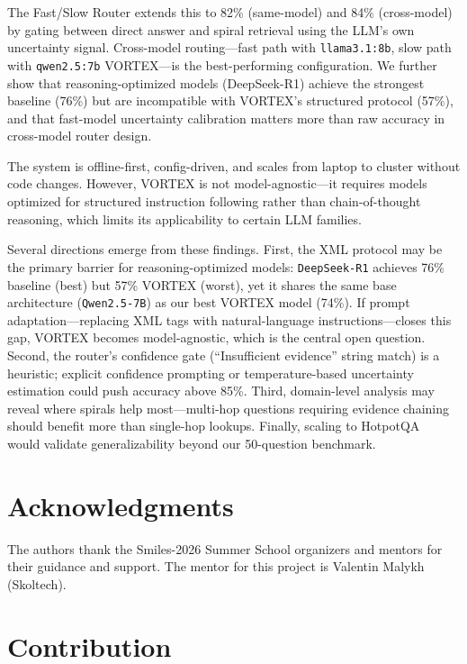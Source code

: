 \documentclass{zapiski}
\begin{document}
The Fast/Slow Router extends this to 82\% (same-model) and 84\% (cross-model) by gating between direct answer and spiral retrieval using the LLM's own uncertainty signal. Cross-model routing---fast path with \texttt{llama3.1:8b}, slow path with \texttt{qwen2.5:7b} VORTEX---is the best-performing configuration. We further show that reasoning-optimized models (DeepSeek-R1) achieve the strongest baseline (76\%) but are incompatible with VORTEX's structured protocol (57\%), and that fast-model uncertainty calibration matters more than raw accuracy in cross-model router design.

The system is offline-first, config-driven, and scales from laptop to cluster without code changes. However, VORTEX is not model-agnostic---it requires models optimized for structured instruction following rather than chain-of-thought reasoning, which limits its applicability to certain LLM families.

Several directions emerge from these findings. First, the XML protocol may be the primary barrier for reasoning-optimized models: \texttt{DeepSeek-R1} achieves 76\% baseline (best) but 57\% VORTEX (worst), yet it shares the same base architecture (\texttt{Qwen2.5-7B}) as our best VORTEX model (74\%). If prompt adaptation---replacing XML tags with natural-language instructions---closes this gap, VORTEX becomes model-agnostic, which is the central open question. Second, the router's confidence gate (``Insufficient evidence'' string match) is a heuristic; explicit confidence prompting or temperature-based uncertainty estimation could push accuracy above 85\%. Third, domain-level analysis may reveal where spirals help most---multi-hop questions requiring evidence chaining should benefit more than single-hop lookups. Finally, scaling to HotpotQA~\cite{yang2018hotpotqa} would validate generalizability beyond our 50-question benchmark.

\section*{Acknowledgments}

The authors thank the Smiles-2026 Summer School organizers and mentors for their guidance and support. The mentor for this project is Valentin Malykh (Skoltech).

\section*{Contribution}
\end{document}

